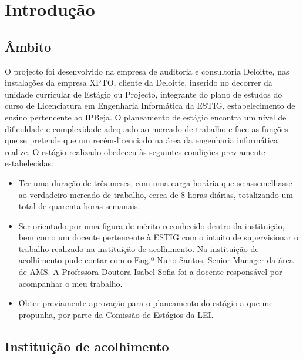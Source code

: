 \chapter{Introdução}
\label{intro}

\section{Âmbito}

\par O projecto foi desenvolvido na empresa de auditoria e consultoria Deloitte, nas instalações da empresa XPTO, cliente da Deloitte, inserido no decorrer da unidade curricular de Estágio ou Projecto, integrante do plano de estudos do curso de Licenciatura em Engenharia Informática da ESTIG, estabelecimento de ensino pertencente ao IPBeja. O planeamento de estágio encontra um nível de dificuldade e complexidade adequado ao mercado de trabalho e face as funções que se pretende que um recém-licenciado na área da engenharia informática realize. O estágio realizado obedeceu às seguintes condições previamente estabelecidas:
\vspace{-20mm}
\begin{itemize}  \itemsep1pt \parskip0pt 
 \item Ter uma duração de três meses, com uma carga horária que se assemelhasse ao verdadeiro mercado de trabalho, cerca de 8 horas diárias, totalizando um total de quarenta horas semanais.
 \item Ser orientado por uma figura de mérito reconhecido dentro da instituição, bem como um docente pertencente à ESTIG com o intuito de supervisionar o trabalho realizado na instituição de acolhimento. Na instituição de acolhimento pude contar com o Eng.º Nuno Santos, Senior Manager da área de AMS. A Professora Doutora Isabel Sofia foi a docente responsável por acompanhar o meu trabalho.
\item Obter previamente aprovação para o planeamento do estágio a que me propunha, por parte da Comissão de Estágios da LEI.
\end{itemize}
\pagebreak

\section{Instituição de acolhimento}

